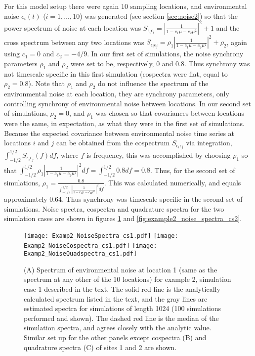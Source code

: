 \documentclass[letterpaper,11pt]{article}
\begin{document}
For this model setup there were again $10$ sampling locations, and environmental noise
$\epsilon_{i}(t)$ ($i=1,\ldots, 10$) was generated (see section \ref{sec:noise2})
so that the power spectrum of noise at each location was 
$S_{\epsilon_{i}\epsilon_{i}} = \left| \frac{1}{1-c_1 \mu -c_2 \mu^2} \right|^{ 2}+1$
and the cross spectrum between any two locations was
$S_{\epsilon_{i}\epsilon_{j}}= \rho_{1}\left| \frac{1}{1-c_1 \mu -c_2 \mu^2} \right|^{ 2}+\rho_2$, again using $c_1=0$ and $c_2=-4/9$. In our first set of simulations,
the noise synchrony parameters $\rho_1$ and $\rho_2$ were set to be,
respectively, $0$ and $0.8$. Thus synchrony was  not timescale specific
in this first simulation (cospectra were flat, equal to $\rho_2=0.8$). 
Note that $\rho_1$ and $\rho_2$
do not influence  the spectrum of the environmental noise  at each location,
they are synchrony parameters,  only controlling synchrony 
of environmental noise between locations. In our second set of simulations,
$\rho_2=0$, and $\rho_1$ was chosen so that covariances between locations
were the same, in expectation, as what they were in the first set of simulations.
Because the expected covariance between environmental noise time series at
locations $i$ and $j$ can be obtained from the cospectrum $S_{\epsilon_{i}\epsilon_{j}}$
via integration, $\int_{-1/2}^{1/2} S_{\epsilon_{i}\epsilon_{j}}(f) df$, 
where $f$ is frequency, this was accomplished by choosing $\rho_1$
so that $\int_{-1/2}^{1/2} \rho_1 \left| \frac{1}{1-c_1 \mu -c_2 \mu^2} \right|^2 df
= \int_{-1/2}^{1/2} 0.8 df = 0.8$. Thus, for the second set of simulations,
$\rho_1 = \frac{0.8}{\int_{-1/2}^{1/2} \left| \frac{1}{1-c_1 \mu -c_2 \mu^2} \right|^2 df}$. This was calculated numerically, and equals approximately $0.64$.
Thus synchrony was timescale specific in the second set of simulations.
Noise spectra, cospectra and quadrature spectra for the two simulation cases
are shown in figures \ref{fig:example2_noise_spectra_cs1} and \ref{fig:example2_noise_spectra_cs2}.

\begin{figure}
\texttt{[image: Examp2\_NoiseSpectra\_cs1.pdf]}
\texttt{[image: Examp2\_NoiseCospectra\_cs1.pdf]}
\texttt{[image: Examp2\_NoiseQuadspectra\_cs1.pdf]}
\caption{(A) Spectrum of environmental noise at location 1 (same as the spectrum at any other of the 10 locations) for example 2, simulation case 1 described in the text. The solid red line is the analytically calculated spectrum listed in the text, and the gray lines are estimated spectra for simulations of length 1024 (100 simulations performed and shown). The dashed red line is the median of the simulation spectra, and agrees closely with the analytic value. Similar set up for the other panels except cospectra (B) and quadrature spectra (C) of sites 1 and 2 are shown.}\label{fig:example2_noise_spectra_cs1}
\end{figure}
\end{document}
